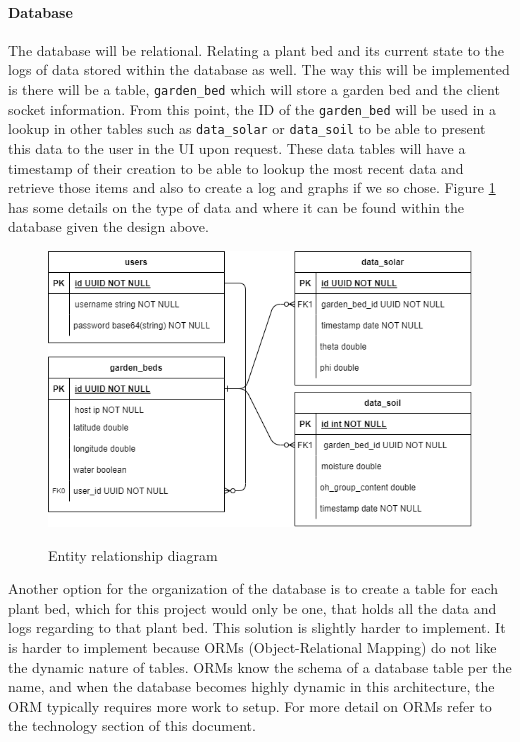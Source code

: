 \paragraph{Database}
The database will be relational. Relating a plant bed and its current state to the logs of data stored within the database as well. The way this will be implemented is there will be a table, \verb|garden_bed| which will store a garden bed and the client socket information. From this point, the ID of the \verb|garden_bed| will be used in a lookup in other tables such as \verb|data_solar| or \verb|data_soil| to be able to present this data to the user in the UI upon request. These data tables will have a timestamp of their creation to be able to lookup the most recent data and retrieve those items and also to create a log and graphs if we so chose. Figure \ref{fig:erd} has some details on the type of data and where it can be found within the database given the design above.
\begin{figure}[H]
    \caption{Entity relationship diagram}
    \centering
    \includegraphics[width=\textwidth]{images/EntityRelation.png}
    \label{fig:erd}
\end{figure}
Another option for the organization of the database is to create a table for each plant bed, which for this project would only be one, that holds all the data and logs regarding to that plant bed. This solution is slightly harder to implement. It is harder to implement because ORMs (Object-Relational Mapping) do not like the dynamic nature of tables. ORMs know the schema of a database table per the name, and when the database becomes highly dynamic in this architecture, the ORM typically requires more work to setup. For more detail on ORMs refer to the technology section of this document.
